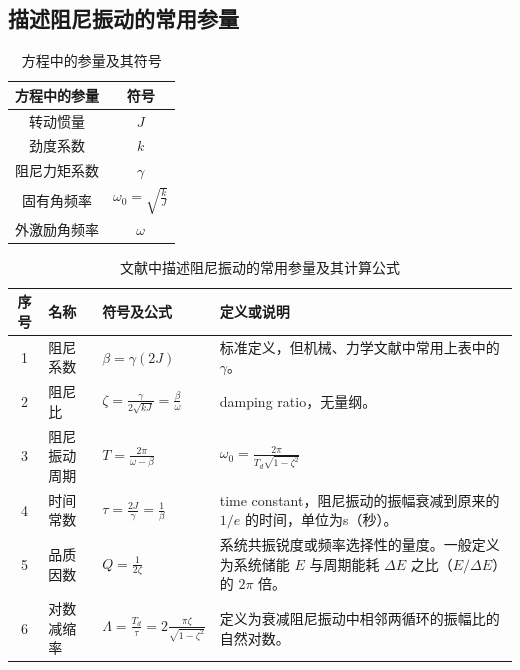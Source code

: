 \documentclass[12pt,a4paper]{amsart}
\begin{document}
\subsection{描述阻尼振动的常用参量}

\begin{table}
	\centering
	\caption{方程中的参量及其符号}
	\begin{tabular}{cc}
		\toprule
		方程中的参量 & 符号                            \\
		\midrule
		转动惯量     & $J$                             \\
		劲度系数     & $k$                             \\
		阻尼力矩系数 & $\gamma$                        \\
		固有角频率   & $\omega_0 = \sqrt{\frac{k}{J}}$ \\
		外激励角频率 & $\omega$                        \\
		\bottomrule
	\end{tabular}
	\label{chart:1}
\end{table}

\begin{table}
	\centering
	\caption{文献中描述阻尼振动的常用参量及其计算公式}
	\begin{tabular}{cp{3cm}p{3.5cm}p{6.5cm}}
		\toprule
		序号 & 名称         & 符号及公式                                                        & 定义或说明                                                                                                      \\
		\midrule
		1    & 阻尼系数     & $\beta = \gamma (2J)$                                             & 标准定义，但机械、力学文献中常用上表中的 $\gamma$。                                                             \\
		2    & 阻尼比       & $\zeta = \frac{\gamma}{2 \sqrt{kJ}} = \frac{\beta}{\omega}$       & damping ratio，无量纲。                                                                                         \\
		3    & 阻尼振动周期 & $T = \frac{2\pi}{\omega - \beta}$                                 & $\omega_0=\frac{2\pi}{T_d\sqrt{1-\zeta^2}}$                                                                     \\
		4    & 时间常数     & $\tau = \frac{2J}{\gamma} = \frac{1}{\beta}$                      & time constant，阻尼振动的振幅衰减到原来的 $1/e$ 的时间，单位为s（秒）。                                         \\
		5    & 品质因数     & $Q = \frac{1}{2\zeta}$                                            & 系统共振锐度或频率选择性的量度。一般定义为系统储能 $E$ 与周期能耗 $\Delta E$ 之比（$E/\Delta E$）的 $2\pi$ 倍。 \\
		6    & 对数减缩率   & $\Lambda = \frac{T_d}{\tau} = 2\frac{\pi\zeta}{\sqrt{1-\zeta^2}}$ & 定义为衰减阻尼振动中相邻两循环的振幅比的自然对数。                                                              \\
		\bottomrule
	\end{tabular}
	\label{chart:2}
\end{table}
\end{document}
